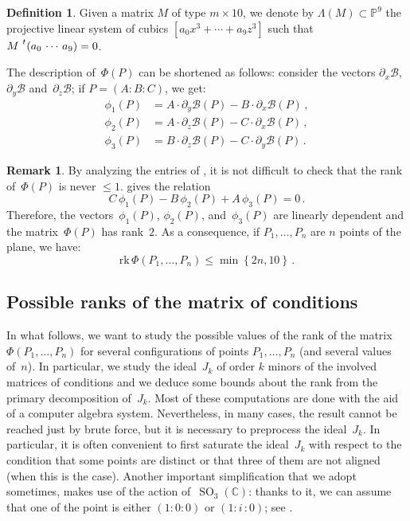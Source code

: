 \documentclass[a4paper, 11pt, reqno]{amsart}
\theoremstyle{plain}
\theoremstyle{definition}
\newtheorem{definition}[lemma]{Definition}
\newtheorem{rmk}[lemma]{Remark}
\newcommand{\C}{\mathbb{C}}
\newcommand{\p}{\mathbb{P}}
\newcommand{\de}{\partial}
\newcommand{\iii}{\textit{i}\,}
\newcommand{\rk}{\ensuremath{\mathrm{rk}}}
\newcommand{\SO}{\operatorname{SO}}
\begin{document}
\begin{definition}
Given a matrix $M$ of type $m \times 10$, we denote by $\Lambda(M) \subset \p^9$ the projective linear system of cubics $[a_0 x^3 + \dotsb + a_9 z^3]$ such that $M \, \prescript{t}{}{\left( a_0 \,  \cdots \,  a_9 \right)} = 0$.
\end{definition}

The description of~$\Phi(P)$ can be shortened as follows: consider the vectors $\de_x \mathcal{B}$,
$\de_y \mathcal{B}$ and~$\de_z \mathcal{B}$;
if $P=(A: B: C)$, we get:
%
\begin{equation}
\label{equation:vector_conditions}
  \begin{aligned}
    \phi_1(P) &= A\cdot \de_y \mathcal{B}(P) - B\cdot \de_x \mathcal{B}(P) \,, \\
    \phi_2(P) &= A\cdot \de_z \mathcal{B}(P) - C\cdot \de_x \mathcal{B}(P) \,, \\
    \phi_3(P) &= B\cdot \de_z \mathcal{B}(P) - C\cdot \de_y \mathcal{B}(P) \,.
  \end{aligned}
\end{equation}
%
\begin{rmk}
\label{remark:rank_2}
By analyzing the entries of , it is not difficult to check that the rank of~$\Phi(P)$ is never $\leq 1$.  gives the relation
%
\begin{equation}
\label{eq:syzygy}
  C \, \phi_1(P) - B \, \phi_2(P) + A \, \phi_3(P) = 0 \,.
\end{equation}
%
Therefore, the vectors~$\phi_1(P)$, $\phi_2(P)$, and~$\phi_3(P)$ are linearly dependent and the matrix~$\Phi(P)$ has rank~$2$.
As a consequence, if $P_1, \dots, P_n$ are $n$ points of the plane, we have:
%
\[
  \rk \,\Phi(P_1, \dots, P_n) \leq \min \left\{2n, 10 \right\} \,.
\]
%
\end{rmk}

\subsection{Possible ranks of the matrix of conditions}

In what follows, we want to study the possible values of the rank of the matrix
$\Phi(P_1, \dots, P_n)$ for several configurations of points $P_1, \dots, P_n$
(and several values of~$n$).
In particular, we study the ideal~$J_k$ of order $k$ minors of the
involved matrices of conditions and we deduce some bounds about the rank from the primary
decomposition of~$J_k$. 
Most of these computations are done with the aid of a computer algebra system.
Nevertheless, in many cases, the result cannot be reached just by brute force, 
but it is necessary to preprocess the ideal~$J_k$. 
In particular, it is often convenient to first saturate the ideal~$J_k$ with respect to
the condition that some points are distinct or that three of them are not aligned 
(when this is the case). 
Another important simplification that we adopt sometimes, makes use
of the action of~$\SO_3(\C)$: thanks to it, we can assume that one of
the point is either $(1: 0: 0)$ or $(1: \iii: 0)$; see .
\end{document}
